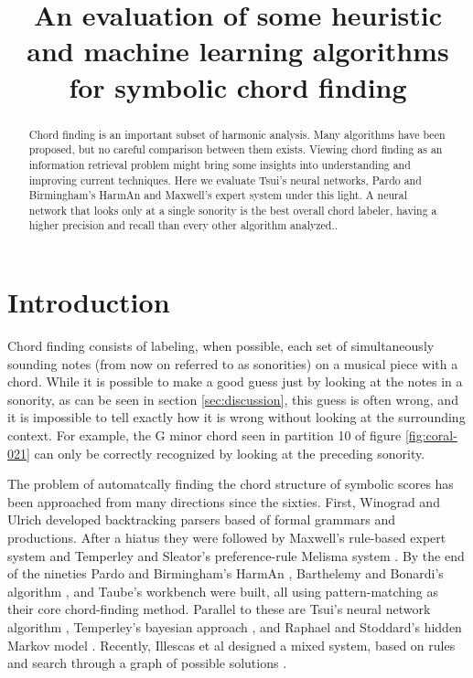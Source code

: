 \documentclass{article}
\title{An evaluation of some heuristic and machine learning algorithms for
  symbolic chord finding} \oneauthor {}{}
\begin{document}
\graphicspath{{figs/}{data/}}
\maketitle

\begin{abstract}
  Chord finding is an important subset of harmonic analysis. Many
  algorithms have been proposed, but no careful comparison between
  them exists. Viewing chord finding as an information retrieval
  problem might bring some insights into understanding and improving
  current techniques. Here we evaluate Tsui's neural networks, Pardo
  and Birmingham's HarmAn and Maxwell's expert system under this
  light. A neural network that looks only at a single sonority is the
  best overall chord labeler, having a higher precision and recall
  than every other algorithm analyzed..
\end{abstract}

\section{Introduction}
\label{sec:introduction}

Chord finding consists of labeling, when possible, each set of
simultaneously sounding notes (from now on referred to as sonorities)
on a musical piece with a chord. While it is possible to make a good
guess just by looking at the notes in a sonority, as can be seen in
section \ref{sec:discussion}, this guess is often wrong, and it is
impossible to tell exactly how it is wrong without looking at the
surrounding context. For example, the G minor chord seen in partition
10 of figure \ref{fig:coral-021} can only be correctly recognized by
looking at the preceding sonority.


The problem of automatcally finding the chord structure of symbolic
scores has been approached from many directions since the
sixties. First, Winograd \cite{winograd:linguistics} and Ulrich
\cite{ulrich:analysis} developed backtracking parsers based of formal
grammars and productions. After a hiatus they were followed by
Maxwell's \cite{maxwell:expert} rule-based expert system and Temperley
and Sleator's preference-rule Melisma system
\cite{temperley.ea:modeling}. By the end of the nineties Pardo and
Birmingham's HarmAn \cite{pardo.ea:algorithms}, Barthelemy and
Bonardi's algorithm \cite{barthelemy.ea:figured}, and Taube's
workbench \cite{taube:automatic} were built, all using
pattern-matching as their core chord-finding method. Parallel to these
are Tsui's neural network algorithm \cite{tsui:harmonic}, Temperley's
bayesian approach \cite{temperley:bayesian}, and Raphael and
Stoddard's hidden Markov model \cite{raphael.ea:harmonic}. Recently,
Illescas et al designed a mixed system, based on rules and search
through a graph of possible solutions \cite{illescas.ea:harmonic}.
\end{document}

